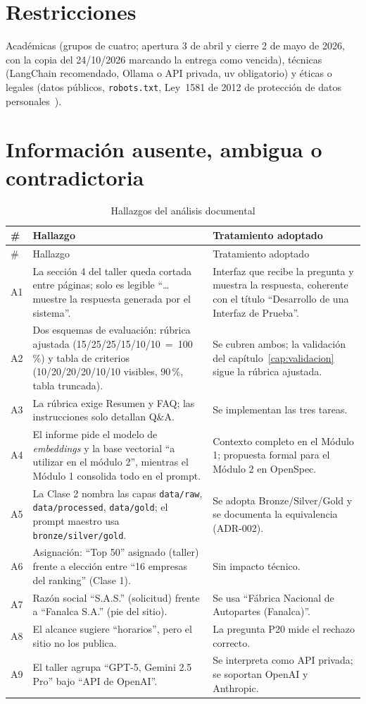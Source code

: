 \section{Restricciones}
Académicas (grupos de cuatro; apertura 3 de abril y cierre 2 de mayo de 2026, con la copia del 24/10/2026
marcando la entrega como vencida), técnicas (LangChain recomendado, Ollama o API privada, uv obligatorio) y
éticas o legales (datos públicos, \texttt{robots.txt}, Ley~1581 de 2012 de protección de datos
personales~\cite{ley1581}).

\section{Información ausente, ambigua o contradictoria}
\begin{longtable}{@{}P{0.6cm}P{7.2cm}P{7.4cm}@{}}
\caption{Hallazgos del análisis documental}\label{tab:ambiguedades}\\\toprule
\# & Hallazgo & Tratamiento adoptado\\\midrule\endfirsthead
\toprule \# & Hallazgo & Tratamiento adoptado\\\midrule\endhead
A1 & La sección 4 del taller queda cortada entre páginas; solo es legible ``\ldots muestre la respuesta
generada por el sistema''. & Interfaz que recibe la pregunta y muestra la respuesta, coherente con el título
``Desarrollo de una Interfaz de Prueba''.\\
A2 & Dos esquemas de evaluación: rúbrica ajustada (15/25/25/15/10/10~=~100\,\%) y tabla de criterios
(10/20/20/20/10/10 visibles, 90\,\%, tabla truncada). & Se cubren ambos; la validación del
capítulo~\ref{cap:validacion} sigue la rúbrica ajustada.\\
A3 & La rúbrica exige Resumen y FAQ; las instrucciones solo detallan Q\&A. & Se implementan las tres tareas.\\
A4 & El informe pide el modelo de \emph{embeddings} y la base vectorial ``a utilizar en el módulo 2'', mientras el
Módulo 1 consolida todo en el prompt. & Contexto completo en el Módulo 1; propuesta formal para el Módulo 2 en
OpenSpec.\\
A5 & La Clase 2 nombra las capas \texttt{data/raw}, \texttt{data/processed}, \texttt{data/gold}; el prompt
maestro usa \texttt{bronze/silver/gold}. & Se adopta Bronze/Silver/Gold y se documenta la equivalencia
(ADR-002).\\
A6 & Asignación: ``Top 50'' asignado (taller) frente a elección entre ``16 empresas del ranking'' (Clase 1). &
Sin impacto técnico.\\
A7 & Razón social ``S.A.S.'' (solicitud) frente a ``Fanalca S.A.'' (pie del sitio). & Se usa ``Fábrica
Nacional de Autopartes (Fanalca)''.\\
A8 & El alcance sugiere ``horarios'', pero el sitio no los publica. & La pregunta P20 mide el rechazo
correcto.\\
A9 & El taller agrupa ``GPT-5, Gemini 2.5 Pro'' bajo ``API de OpenAI''. & Se interpreta como API privada; se
soportan OpenAI y Anthropic.\\\bottomrule
\end{longtable}
